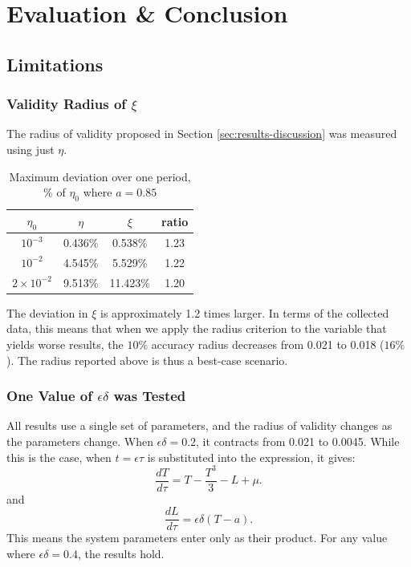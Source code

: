 \section{Evaluation \& Conclusion}\label{sec:evaluation-conclusion}
\subsection{Limitations}
\subsubsection{Validity Radius of $\xi$}
The radius of validity proposed in Section \ref{sec:results-discussion} was measured using just $\eta$. 

	\begin{table}[H]
        \centering
        \begin{tabular}{cccc}
            \toprule
            \textbf{$\eta_0$} & $\eta$ & $\xi$ & ratio \\
            \midrule
            $10^{-3}$ & 0.436\% & 0.538\% & 1.23   \\
            $10^{-2}$ & 4.545\% & 5.529\% & 1.22 \\
            $2\times10^{-2}$ & 9.513\% & 11.423\% & 1.20 \\
            \bottomrule
        \end{tabular}
        \caption{Maximum deviation over one period, \% of $\eta_0$ where $a=0.85$}
        \label{tab:deviation-over-period}
    \end{table}

The deviation in $\xi$ is approximately 1.2 times larger. In terms of the collected data, this means that when we apply the radius criterion to the variable that yields worse results, the $10\%$ accuracy radius decreases from 0.021 to 0.018 ($16\%$). The radius reported above is thus a best-case scenario.

\subsubsection{One Value of $\epsilon\delta$ was Tested}
All results use a single set of parameters, and the radius of validity changes as the parameters change. When $\epsilon\delta=0.2$, it contracts from 0.021 to 0.0045. While this is the case, when $t =\epsilon\tau$ is substituted into the expression, it gives:
\[
\frac{dT}{d\tau}=T-\frac{T^3}{3}-L+\mu.
\]
and
\[
\frac{dL}{d\tau} = \epsilon\delta(T - a).
\]
This means the system parameters enter only as their product. For any value where $\epsilon\delta=0.4$, the results hold.

